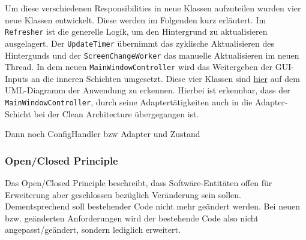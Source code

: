 Um diese verschiedenen Responsibilities in neue Klassen aufzuteilen wurden vier neue Klassen entwickelt. Diese werden im Folgenden kurz erläutert. Im \texttt{Refresher} ist die generelle Logik, um den Hintergrund zu aktualisieren ausgelagert. Der \texttt{UpdateTimer} übernimmt das zyklische Aktualisieren des Hintergunds und der \texttt{ScreenChangeWorker} das manuelle Aktualisieren im neuen Thread. In dem neuen \texttt{MainWindowController} wird das Weitergeben der GUI-Inputs an die inneren Schichten umgesetzt. Diese vier Klassen sind \href{https://github.com/Bronzila/WeatherWallpaper/blob/master/CleanArchitecturePics/Architektur_Vorher.jpg}{\color{blue}hier} auf dem UML-Diagramm der Anwendung zu erkennen. Hierbei ist erkennbar, dass der \texttt{MainWindowController}, durch seine Adaptertätigkeiten auch in die Adapter-Schicht bei der Clean Architecture übergegangen ist.

Dann noch ConfigHandler bzw Adapter und Zustand
\subsubsection{Open/Closed Principle}
Das Open/Closed Principle beschreibt, dass Softwäre-Entitäten offen für Erweiterung aber geschlossen bezüglich Veränderung sein sollen. Dementsprechend soll bestehender Code nicht mehr geändert werden. Bei neuen bzw. geänderten Anforderungen wird der bestehende Code also nicht angepasst/geändert, sondern lediglich erweitert.

